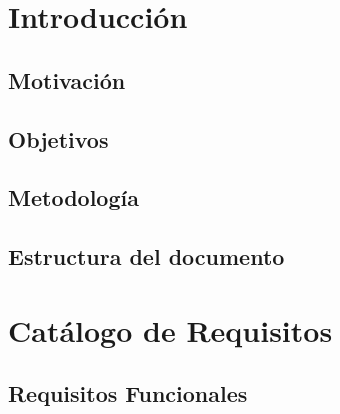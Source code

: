 \documentclass[12pt, a4paper, twoside]{article}
\begin{document}


\clearpage
\setcounter{page}{1}

\newpage


\newpage



\tableofcontents
\newpage\cleardoublepage


{}
\listoffigures

\section{Introducción}

\subsection{Motivación}


\subsection{Objetivos}


\subsection{Metodología}


\subsection{Estructura del documento}

\newpage\cleardoublepage


\section{Catálogo de Requisitos}



\subsection{Requisitos Funcionales}

\end{document}
